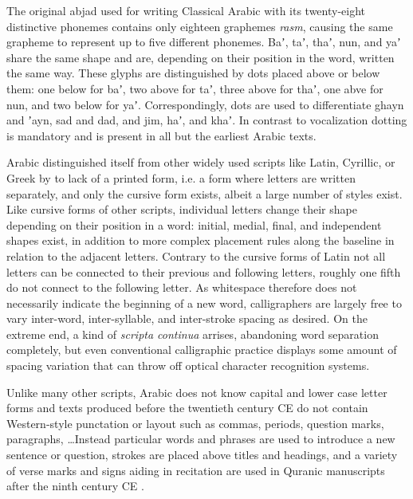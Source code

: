 The original abjad used for writing Classical Arabic with its twenty-eight
distinctive phonemes contains only eighteen graphemes \emph{rasm}, causing the
same grapheme to represent up to five different phonemes. Baʼ, taʼ, thaʼ, nun,
and yaʼ share the same shape and are, depending on their position in the word,
written the same way. These glyphs are distinguished by dots placed above or
below them: one below for baʼ, two above for taʼ, three above for thaʼ, one
abve for nun, and two below for yaʼ. Correspondingly, dots are used to
differentiate ghayn and ʼayn, sad and dad, and jim, haʼ, and khaʼ. In contrast
to vocalization dotting is mandatory and is present in all but the earliest
Arabic texts.

Arabic distinguished itself from other widely used scripts like Latin,
Cyrillic, or Greek by to lack of a printed form, i.e. a form where letters are
written separately, and only the cursive form exists, albeit a large number of
styles exist. Like cursive forms of other scripts, individual letters change
their shape depending on their position in a word: initial, medial, final, and
independent shapes exist, in addition to more complex placement rules along the
baseline in relation to the adjacent letters. Contrary to the cursive forms of
Latin not all letters can be connected to their previous and following letters,
roughly one fifth do not connect to the following letter. As whitespace
therefore does not necessarily indicate the beginning of a new word,
calligraphers are largely free to vary inter-word, inter-syllable, and
inter-stroke spacing as desired. On the extreme end, a kind of \emph{scripta
continua} arrises\cite[pg. 15]{blair2006islamic}, abandoning word separation
completely, but even conventional calligraphic practice displays some amount of
spacing variation that can throw off optical character recognition systems.

Unlike many other scripts, Arabic does not know capital and lower case letter
forms and texts produced before the twentieth century CE do not contain
Western-style punctation or layout such as commas, periods, question marks,
paragraphs, \dots Instead particular words and phrases are used to introduce a
new sentence or question, strokes are placed above titles and headings, and a
variety of verse marks and signs aiding in recitation are used in Quranic
manuscripts after the ninth century CE \cite{awad2015evolution}.

